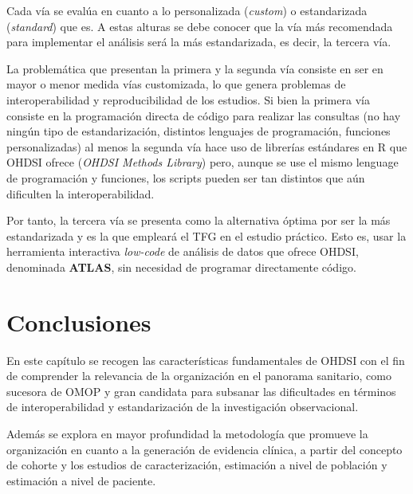 Cada vía se evalúa en cuanto a lo personalizada (\textit{custom}) o estandarizada (\textit{standard}) que es. A estas alturas se debe conocer que la vía más recomendada para implementar el análisis será la más estandarizada, es decir, la tercera vía.

La problemática que presentan la primera y la segunda vía consiste en ser en mayor o menor medida vías customizada, lo que genera problemas de interoperabilidad y reproducibilidad de los estudios. Si bien la primera vía consiste en la programación directa de código para realizar las consultas  (no hay ningún tipo de estandarización, distintos lenguajes de programación, funciones personalizadas) al menos la segunda vía hace uso de librerías estándares en R que OHDSI ofrece (\textit{OHDSI Methods Library}) pero, aunque se use el mismo lenguage de programación y funciones, los scripts pueden ser tan distintos que aún dificulten la interoperabilidad.

Por tanto, la tercera vía se presenta como la alternativa óptima por ser la más estandarizada y es la que empleará el TFG en el estudio práctico. Esto es, usar la herramienta interactiva \textit{low-code} de análisis de datos que ofrece OHDSI, denominada \textbf{ATLAS}, sin necesidad de programar directamente código.

\section{Conclusiones} \label{sec:05conclusion}

En este capítulo se recogen las características fundamentales de OHDSI con el fin de comprender la relevancia de la organización en el panorama sanitario, como sucesora de OMOP y gran candidata para subsanar las dificultades en términos de interoperabilidad y estandarización de la investigación observacional.

Además se explora en mayor profundidad la metodología que promueve la organización en cuanto a la generación de evidencia clínica, a partir del concepto de cohorte y los estudios de caracterización, estimación a nivel de población y estimación a nivel de paciente.